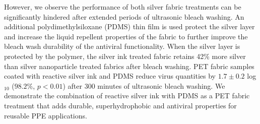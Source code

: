 \documentclass[journal=jacsat,manuscript=article]{achemso}
\begin{document}
However, we observe the performance of both silver fabric treatments can be significantly hindered after extended periods of ultrasonic bleach washing. 
An additional polydimethylsiloxane (PDMS) thin film is used protect the silver layer and increase the liquid repellent properties of the fabric to further improve %
the bleach wash durability of the antiviral functionality. 
When the silver layer is protected by the polymer, the silver ink treated fabric retains 42\% more silver than silver nanoparticle treated fabrics after bleach washing.
PET fabric samples coated with reactive silver ink and PDMS reduce virus quantities by $1.7 \pm 0.2$ log$_{10}$ ($98.2 %
\%$, $p < 0.01$) after 300 minutes of ultrasonic bleach washing. 
We demonstrate the combination of reactive silver ink with PDMS as a PET fabric treatment that adds durable, superhydrophobic and antiviral properties for reusable PPE applications. 


\end{document}
